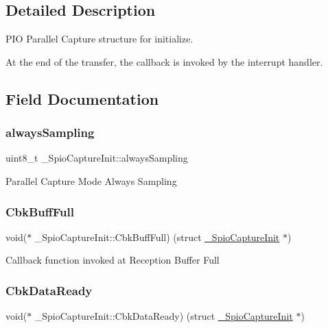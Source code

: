 \subsection{Detailed Description}
P\+IO Parallel Capture structure for initialize. 

At the end of the transfer, the callback is invoked by the interrupt handler. 

\subsection{Field Documentation}
\mbox{\label{struct__SpioCaptureInit_acbd56db5ae34a038a697f0d4f66de27c}} 
\subsubsection{\texorpdfstring{alwaysSampling}{alwaysSampling}}
{\footnotesize\ttfamily uint8\+\_\+t \+\_\+\+Spio\+Capture\+Init\+::always\+Sampling}

Parallel Capture Mode Always Sampling \mbox{\label{struct__SpioCaptureInit_a898d2894025577b0dc6ca45734f0ec76}} 
\subsubsection{\texorpdfstring{CbkBuffFull}{CbkBuffFull}}
{\footnotesize\ttfamily void($\ast$ \+\_\+\+Spio\+Capture\+Init\+::\+Cbk\+Buff\+Full) (struct \mbox{\hyperlink{struct__SpioCaptureInit}{\+\_\+\+Spio\+Capture\+Init}} $\ast$)}

Callback function invoked at Reception Buffer Full \mbox{\label{struct__SpioCaptureInit_aff4b26df573a3abc87acee0ca6aaed3d}} 
\subsubsection{\texorpdfstring{CbkDataReady}{CbkDataReady}}
{\footnotesize\ttfamily void($\ast$ \+\_\+\+Spio\+Capture\+Init\+::\+Cbk\+Data\+Ready) (struct \mbox{\hyperlink{struct__SpioCaptureInit}{\+\_\+\+Spio\+Capture\+Init}} $\ast$)}

